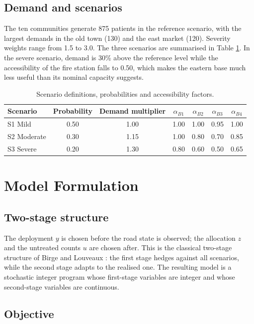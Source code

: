 \documentclass{apmcmthesis}
\begin{document}
\subsection{Demand and scenarios}

The ten communities generate 875 patients in the reference scenario, with the largest demands in the old town (130) and the east market (120). Severity weights range from 1.5 to 3.0. The three scenarios are summarised in Table \ref{tab:scenario}. In the severe scenario, demand is 30\% above the reference level while the accessibility of the fire station falls to 0.50, which makes the eastern base much less useful than its nominal capacity suggests.

\begin{table}[!ht]
\centering
\caption{Scenario definitions, probabilities and accessibility factors.}
\label{tab:scenario}
\small
\begin{tabular}{lcccccc}
\toprule
Scenario & Probability & Demand multiplier & $\alpha_{B1}$ & $\alpha_{B2}$ & $\alpha_{B3}$ & $\alpha_{B4}$ \\
\midrule
S1 Mild     & 0.50 & 1.00 & 1.00 & 1.00 & 0.95 & 1.00 \\
S2 Moderate & 0.30 & 1.15 & 1.00 & 0.80 & 0.70 & 0.85 \\
S3 Severe   & 0.20 & 1.30 & 0.80 & 0.60 & 0.50 & 0.65 \\
\bottomrule
\end{tabular}
\end{table}

\section{Model Formulation}

\subsection{Two-stage structure}

The deployment $y$ is chosen before the road state is observed; the allocation $z$ and the untreated counts $u$ are chosen after. This is the classical two-stage structure of Birge and Louveaux \cite{birge2011}: the first stage hedges against all scenarios, while the second stage adapts to the realised one. The resulting model is a stochastic integer program whose first-stage variables are integer and whose second-stage variables are continuous.

\subsection{Objective}
\end{document}
